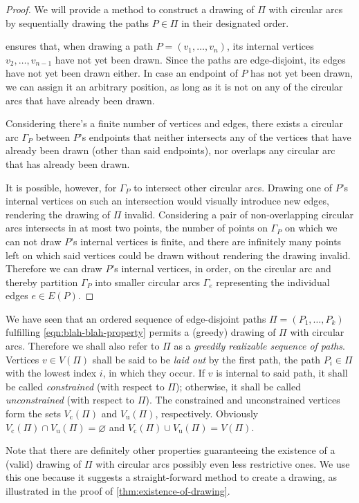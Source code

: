 \begin{proof}
We will provide a method to construct a drawing of ${\Pi}$ with circular arcs by sequentially drawing the paths ${P \in \Pi}$ in their designated order.

 ensures that, when drawing a path ${P = (v_1, \ldots, v_n)}$, its internal vertices ${v_2, \ldots, v_{n-1}}$ have not yet been drawn. Since the paths are edge-disjoint, its edges have not yet been drawn either. In case an endpoint of ${P}$ has not yet been drawn, we can assign it an arbitrary position, as long as it is not on any of the circular arcs that have already been drawn.

Considering there's a finite number of vertices and edges, there exists a circular arc ${\Gamma_P}$ between ${P}$'s endpoints that neither intersects any of the vertices that have already been drawn (other than said endpoints), nor overlaps any circular arc that has already been drawn.

It is possible, however, for ${\Gamma_P}$ to intersect other circular arcs. Drawing one of ${P}$'s internal vertices on such an intersection would visually introduce new edges, rendering the drawing of ${\Pi}$ invalid. Considering a pair of non-overlapping circular arcs intersects in at most two points, the number of points on ${\Gamma_P}$ on which we can not draw ${P}$'s internal vertices is finite, and there are infinitely many points left on which said vertices could be drawn without rendering the drawing invalid. Therefore we can draw ${P}$'s internal vertices, in order, on the circular arc and thereby partition ${\Gamma_P}$ into smaller circular arcs ${\Gamma_e}$ representing the individual edges ${e \in E(P)}$.
\end{proof}





\hfill

\noindent
We have seen that an ordered sequence of edge-disjoint paths ${\Pi = (P_1, \ldots, P_k)}$ fulfilling \cref{eqn:blah-blah-property} permits a (greedy) drawing of ${\Pi}$ with circular arcs. Therefore we shall also refer to ${\Pi}$ as a \emph{greedily realizable sequence of paths}. Vertices ${v \in V(\Pi)}$ shall be said to be \emph{laid out} by the first path, \ie{} the path ${P_i \in \Pi}$ with the lowest index ${i}$, in which they occur. If ${v}$ is internal to said path, it shall be called \emph{constrained} (with respect to ${\Pi}$); otherwise, it shall be called \emph{unconstrained} (with respect to ${\Pi}$). The constrained and unconstrained vertices form the sets ${V_\text{c}(\Pi)}$ and ${V_\text{u}(\Pi)}$, respectively. Obviously ${V_\text{c}(\Pi) \cap V_\text{u}(\Pi) = \varnothing}$ and ${V_\text{c}(\Pi) \cup V_\text{u}(\Pi) = V(\Pi)}$.

Note that there are definitely other properties guaranteeing the existence of a (valid) drawing of ${\Pi}$ with circular arcs \emdash possibly even less restrictive ones. We use this one because it suggests a straight-forward method to create a drawing, as illustrated in the proof of \cref{thm:existence-of-drawing}.
